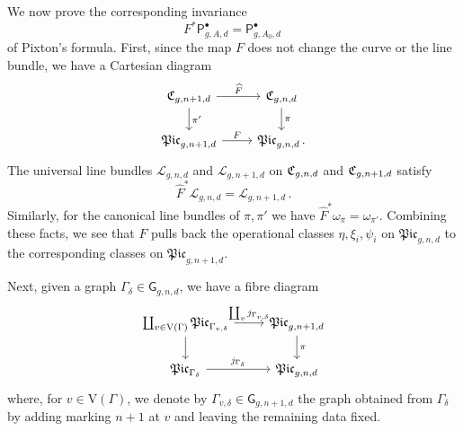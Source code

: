 \documentclass[a4paper,12pt]{article} %
\newcommand{\ca}[1]{{\mathcal{#1}}}
\def\P{\mathsf{P}}
\def\n{\mathrm{n}}
\def\V{\mathrm{V}}
\def\g{\mathrm{g}}
\def\G{\mathsf{G}}
\theoremstyle{definition}
\theoremstyle{plain}%
\newtheorem{lemma}[definition]{Lemma}
\newcommand{\Picabs}{\mathfrak{Pic}}
\begin{document}
We now prove the corresponding invariance
\begin{equation} \label{eqn:P_forget_pullback}
    F^* \P_{g,A,d}^\bullet = \P_{g,A_0,d}^\bullet\ 
\end{equation}
of Pixton's formula. First, since the map $F$ does not change the curve or the line bundle, we have a Cartesian diagram
\[
\begin{tikzcd}
\frak C_{g,n+1,d} \arrow[r,"\widehat{F}"] \arrow[d,"\pi'"]& \frak C_{g,n,d} \arrow[d,"\pi"]\\
\Picabs_{g,n+1,d} \arrow[r,"{F}"]& \Picabs_{g,n,d}\, .
\end{tikzcd}
\]
The universal line bundles $\ca L_{g,n,d}$ and $\ca L_{g,n+1,d}$ on $\frak C_{g,n,d}$ and $\frak C_{g,n+1,d}$ satisfy  $$\widehat{F}^* \ca L_{g,n,d} = \ca L_{g,n+1,d}\, .$$ Similarly, for the canonical line bundles of $\pi, \pi'$ we have $\widehat{F}^* \omega_\pi = \omega_{\pi'}$. Combining these facts, we see that $F$ pulls back the operational
classes $\eta, \xi_i, \psi_i$ on $\Picabs_{g,n,d}$ 
to the corresponding classes on $\Picabs_{g,n+1,d}$.

Next, given a graph $\Gamma_\delta \in \G_{g,n,d}$, we have a fibre diagram
\begin{equation} \label{eqn:forgetgluefibre}
\begin{tikzcd}
 \coprod_{v \in \V(\Gamma)} \Picabs_{\Gamma_{v,\delta}} \arrow[r,"\coprod_v j_{\Gamma_{v,\delta}}"] \arrow[d] & \Picabs_{g,n+1,d} \arrow[d,"\pi"]\\
 \Picabs_{\Gamma_{\delta}} \arrow[r,"j_{\Gamma_{\delta}}"] & \Picabs_{g,n,d}
\end{tikzcd}
\end{equation}
where, for $v \in \V(\Gamma)$, we denote by $\Gamma_{v,\delta} \in \G_{g,n+1,d}$ the graph obtained from $\Gamma_\delta$ by adding marking $n+1$ at $v$ and leaving the remaining data fixed. 
\end{document}
